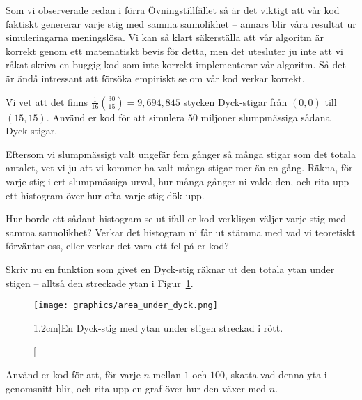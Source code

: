 \documentclass[nobib]{tufte-handout}
\begin{document}
Som vi observerade redan i förra Övningstillfället så är det viktigt att vår kod faktiskt genererar varje stig med samma sannolikhet -- annars blir våra resultat ur simuleringarna meningslösa. Vi kan så klart säkerställa att vår algoritm är korrekt genom ett matematiskt bevis för detta, men det utesluter ju inte att vi råkat skriva en buggig kod som inte korrekt implementerar vår algoritm. Så det är ändå intressant att försöka empiriskt se om vår kod verkar korrekt.

\begin{xca}
    Vi vet att det finns $\frac{1}{16}\binom{30}{15} = 9,694,845$ stycken Dyck-stigar från $(0,0)$ till $(15,15)$. Använd er kod för att simulera $50$ miljoner slumpmässiga sådana Dyck-stigar.

    Eftersom vi slumpmässigt valt ungefär fem gånger så många stigar som det totala antalet, vet vi ju att vi kommer ha valt många stigar mer än en gång. Räkna, för varje stig i ert slumpmässiga urval, hur många gånger ni valde den, och rita upp ett histogram över hur ofta varje stig dök upp.

    Hur borde ett sådant histogram se ut ifall er kod verkligen väljer varje stig med samma sannolikhet? Verkar det histogram ni får ut stämma med vad vi teoretiskt förväntar oss, eller verkar det vara ett fel på er kod?
\end{xca}

\begin{xca}
    Skriv nu en funktion som givet en Dyck-stig räknar ut den totala ytan under stigen -- alltså den streckade ytan i Figur~\ref{fig:area_under_dyck}.

    \begin{figure}
        \centering
        \texttt{[image: graphics/area\_under\_dyck.png]}
        \caption[][1.2cm]{En Dyck-stig med ytan under stigen streckad i rött.}
        \label{fig:area_under_dyck}
    \end{figure}

    Använd er kod för att, för varje $n$ mellan $1$ och $100$, skatta vad denna yta i genomsnitt blir, och rita upp en graf över hur den växer med $n$.
\end{xca}
\end{document}
